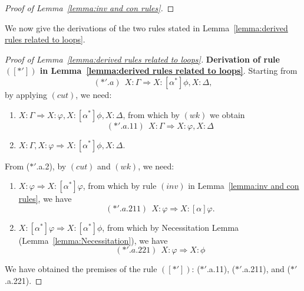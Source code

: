 \documentclass[manuscript,screen]{acmart}
\newcommand{\lup}[0]{*}
\begin{document}
\begin{proof}[Proof of Lemma~\ref{lemma:inv and con rules}]
\end{proof}

 We now give the derivations of the two rules stated in Lemma~\ref{lemma:derived rules related to loops}. 

\begin{proof}[Proof of Lemma~\ref{lemma:derived rules related to loops}]
    \textbf{Derivation of rule \mbox{$([\lup'])$} in Lemma~\ref{lemma:derived rules related to loops}}. 
    Starting from 
    $$
    (*'.a)\ \ X : \Gamma\Rightarrow X : [\alpha^\lup]\phi, X : \Delta,
    $$
    by applying $(cut)$, we need:
    \begin{enumerate}
    \item[($*'$.a.1)] $X : \Gamma\Rightarrow X : \varphi, X : [\alpha^*]\phi, X : \Delta$, from which by $(wk)$ we obtain
    $$
    (*'.a.11)\ \ X : \Gamma\Rightarrow X : \varphi, X : \Delta
    $$
    \item[($*'$.a.2)] $X : \Gamma,  X : \varphi\Rightarrow X : [\alpha^\lup]\phi, X : \Delta$. 
    \end{enumerate}
    From ($*'$.a.2), by $(cut)$ and $(wk)$, we need:
    \begin{enumerate}
    \item[($*'$.a.21)] $X : \varphi\Rightarrow X : [\alpha^\lup]\varphi$, from which by rule $(inv)$ in Lemma~\ref{lemma:inv and con rules}, we have
    $$
        (*'.a.211)\ \ X : \varphi\Rightarrow X : [\alpha]\varphi.
    $$
    \item[($*'$.a.22)] $X : [\alpha^\lup]\varphi\Rightarrow X : [\alpha^\lup]\phi$, from which by Necessitation Lemma (Lemma~\ref{lemma:Necessitation}), we have
    $$
    (*'.a.221)\ \ X : \varphi\Rightarrow X : \phi
    $$
    \end{enumerate}
We have obtained the premises of the rule $([*'])$: ($*'$.a.11), ($*'$.a.211), and ($*'$.a.221). 


\end{proof}
\end{document}
